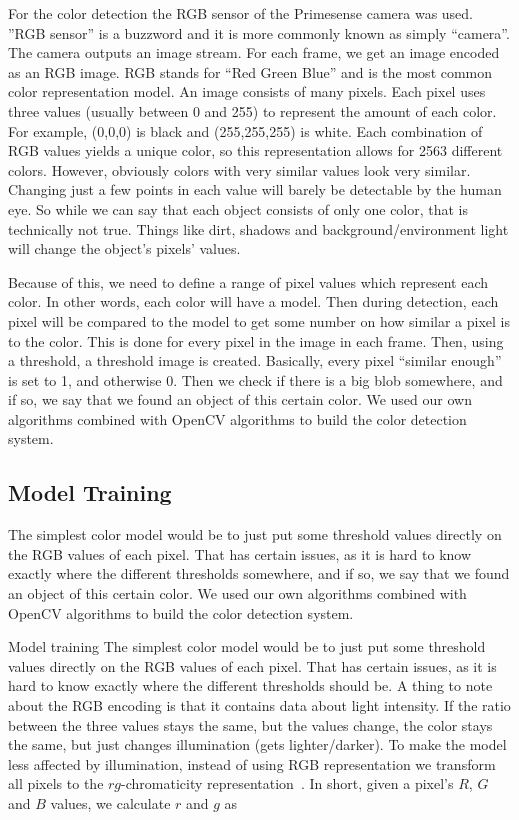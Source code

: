 For the color detection the RGB sensor of the Primesense camera was used. ”RGB
sensor” is a buzzword and it is more commonly known as simply “camera”. The
camera outputs an image stream. For each frame, we get an image encoded as an
RGB image. RGB stands for “Red Green Blue” and is the most common color
representation model. An image consists of many pixels. Each pixel uses three
values (usually between 0 and 255) to represent the amount of each color. For
example, (0,0,0) is black and (255,255,255) is white. Each combination of RGB
values yields a unique color, so this representation allows for 2563 different
colors. However, obviously colors with very similar values look very similar.
Changing just a few points in each value will barely be detectable by the human
eye. So while we can say that each object consists of only one color, that is
technically not true. Things like dirt, shadows and background/environment light
will change the object’s pixels’ values.

Because of this, we need to define a range of pixel values which represent each
color. In other words, each color will have a model. Then during detection, each
pixel will be compared to the model to get some number on how similar a pixel is
to the color. This is done for every pixel in the image in each frame. Then,
using a threshold, a threshold image is created. Basically, every pixel “similar
enough” is set to 1, and otherwise 0. Then we check if there is a big blob
somewhere, and if so, we say that we found an object of this certain color. We
used our own algorithms combined with OpenCV algorithms to build the color
detection system.

\subsection{Model Training}
The simplest color model would be to just put some threshold values directly on
the RGB values of each pixel. That has certain issues, as it is hard to know
exactly where the different thresholds somewhere, and if so, we say that we
found an object of this certain color. We used our own algorithms combined with
OpenCV algorithms to build the color detection system.

Model training The simplest color model would be to just put some threshold
values directly on the RGB values of each pixel. That has certain issues, as it
is hard to know exactly where the different thresholds should be. A thing to
note about the RGB encoding is that it contains data about light intensity. If
the ratio between the three values stays the same, but the values change, the
color stays the same, but just changes illumination (gets lighter/darker). To
make the model less affected by illumination, instead of using RGB
representation we transform all pixels to the $rg$-chromaticity
representation~\cite{rgchrom}. In short, given a pixel’s $R$, $G$ and $B$ values, we
calculate $r$ and $g$ as

